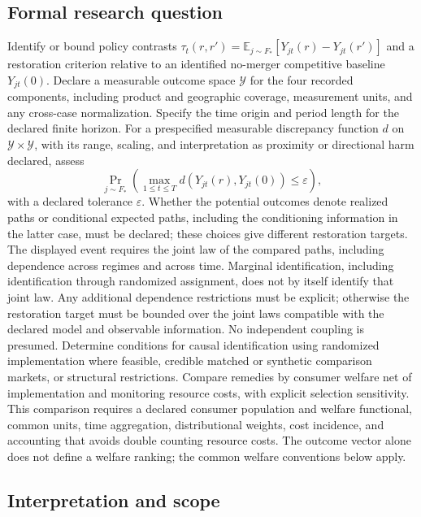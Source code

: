 \documentclass[11pt,a4paper]{article}
\begin{document}
\subsection*{Formal research question}

Identify or bound policy contrasts $\tau_t(r,r')=\mathbb E_{j\sim F_*}[Y_{jt}(r)-Y_{jt}(r')]$ and a restoration criterion relative to an identified no-merger competitive baseline $Y_{jt}(0)$. Declare a measurable outcome space $\mathcal Y$ for the four recorded components, including product and geographic coverage, measurement units, and any cross-case normalization. Specify the time origin and period length for the declared finite horizon. For a prespecified measurable discrepancy function $d$ on $\mathcal Y\times\mathcal Y$, with its range, scaling, and interpretation as proximity or directional harm declared, assess
\[
\Pr_{j\sim F_*}\!\left(\max_{1\leq t\leq T}d(Y_{jt}(r),Y_{jt}(0))\leq\varepsilon\right),
\]
with a declared tolerance $\varepsilon$. Whether the potential outcomes denote realized paths or conditional expected paths, including the conditioning information in the latter case, must be declared; these choices give different restoration targets. The displayed event requires the joint law of the compared paths, including dependence across regimes and across time. Marginal identification, including identification through randomized assignment, does not by itself identify that joint law. Any additional dependence restrictions must be explicit; otherwise the restoration target must be bounded over the joint laws compatible with the declared model and observable information. No independent coupling is presumed. Determine conditions for causal identification using randomized implementation where feasible, credible matched or synthetic comparison markets, or structural restrictions. Compare remedies by consumer welfare net of implementation and monitoring resource costs, with explicit selection sensitivity. This comparison requires a declared consumer population and welfare functional, common units, time aggregation, distributional weights, cost incidence, and accounting that avoids double counting resource costs. The outcome vector alone does not define a welfare ranking; the common welfare conventions below apply.

\subsection*{Interpretation and scope}
\end{document}
